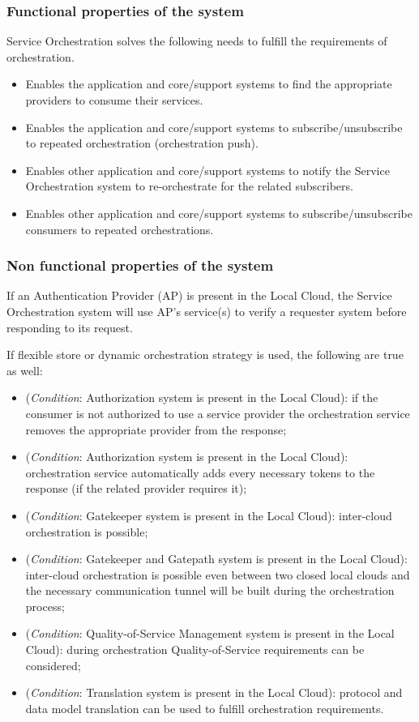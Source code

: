 \documentclass[a4paper]{arrowhead}
\begin{document}
\subsubsection {Functional properties of the system}
Service Orchestration solves the following needs to fulfill the requirements of orchestration.

\begin{itemize}
    \item Enables the application and core/support systems to find the appropriate providers to consume their services.
    \item Enables the application and core/support systems to subscribe/unsubscribe to repeated orchestration (orchestration push).
    \item Enables other application and core/support systems to notify the Service Orchestration system to re-orchestrate for the related subscribers.
    \item Enables other application and core/support systems to subscribe/unsubscribe consumers to repeated orchestrations.
\end{itemize}

\subsubsection {Non functional properties of the system}
If an Authentication Provider (AP) is present in the Local Cloud, the Service Orchestration system will use AP's service(s) to verify a requester system before responding to its request.  

If flexible store or dynamic orchestration strategy is used, the following are true as well:

\begin{itemize}
    \item (\textit{Condition}: Authorization system is present in the Local Cloud): if the consumer is not authorized to use a service provider the orchestration service removes the appropriate provider from the response;
    \item (\textit{Condition}: Authorization system is present in the Local Cloud): orchestration service automatically adds every necessary tokens to the response (if the related provider requires it);
    \item (\textit{Condition}: Gatekeeper system is present in the Local Cloud): inter-cloud orchestration is possible;
    \item (\textit{Condition}: Gatekeeper and Gatepath system is present in the Local Cloud): inter-cloud orchestration is possible even between two closed local clouds and the necessary communication tunnel will be built during the orchestration process;
    \item (\textit{Condition}: Quality-of-Service Management system is present in the Local Cloud): during orchestration Quality-of-Service requirements can be considered;
    \item (\textit{Condition}: Translation system is present in the Local Cloud): protocol and data model translation can be used to fulfill orchestration requirements.
\end{itemize}
\end{document}
